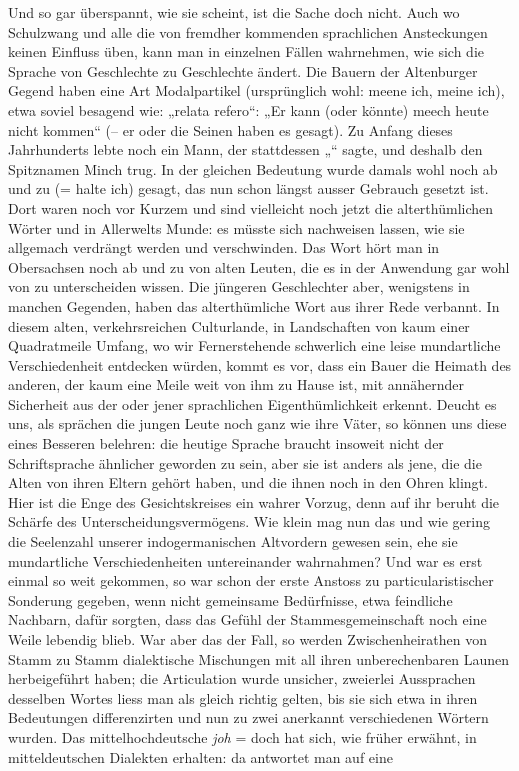 {Und so gar überspannt, wie sie scheint, ist die Sache doch nicht. Auch wo Schulzwang und alle die von fremdher kommenden sprachlichen Ansteckungen keinen Einfluss üben, kann man in einzelnen Fällen wahrnehmen, wie sich die Sprache von Geschlechte zu Geschlechte ändert. \label{fp.278} Die Bauern der Altenburger Gegend haben eine Art Modalpartikel  (ursprünglich wohl: meene ich, meine ich), etwa soviel besagend wie: „relata refero“: „Er kann (oder könnte) meech heute nicht kommen“ (– er oder die Seinen haben es gesagt). Zu Anfang dieses Jahrhunderts lebte noch ein Mann, der stattdessen „“ sagte, und deshalb den Spitznamen Minch trug. In der gleichen Bedeutung wurde damals wohl noch ab und zu  (= halte ich) gesagt, das nun schon längst ausser Gebrauch gesetzt ist. Dort waren noch vor Kurzem und sind vielleicht noch jetzt die alterthümlichen Wörter  und  in Allerwelts Munde: es müsste sich nachweisen lassen, wie sie allgemach verdrängt werden und verschwinden. Das Wort  hört man in Obersachsen noch ab und zu von alten Leuten, die es in der Anwendung gar wohl von  zu unterscheiden wissen. Die jüngeren Geschlechter aber, wenigstens in manchen Gegenden, haben das  alterthümliche Wort aus ihrer Rede verbannt. In diesem alten, verkehrsreichen Culturlande, in Landschaften von kaum einer Quadratmeile Umfang, wo wir Fernerstehende schwerlich eine leise mundartliche Verschiedenheit entdecken würden, kommt es vor, dass ein Bauer die Heimath des anderen, der kaum eine Meile weit von ihm zu Hause ist, mit annähernder Sicherheit aus der oder jener sprachlichen Eigenthümlichkeit erkennt. Deucht es uns, als sprächen die jungen Leute noch ganz wie ihre Väter, so können uns diese eines Besseren belehren: die heutige Sprache braucht insoweit nicht der Schriftsprache ähnlicher geworden zu sein, aber sie ist anders als jene, die die Alten von ihren Eltern gehört haben, und die ihnen noch in den Ohren klingt. Hier ist die Enge des Gesichtskreises ein wahrer Vorzug, denn auf ihr beruht die Schärfe des Unterscheidungsvermögens. Wie klein mag nun das  und wie gering die Seelenzahl unserer indo\-\label{sp.285}germanischen Altvordern gewesen sein, ehe sie mundartliche Verschiedenheiten untereinander wahrnahmen? Und war es erst einmal so weit gekommen, so war schon der erste Anstoss zu particularistischer Sonderung gegeben, wenn nicht gemeinsame Bedürfnisse, etwa feindliche Nachbarn, dafür sorgten, dass das Gefühl der Stammesgemeinschaft noch eine Weile lebendig blieb. War aber das der Fall, so werden Zwischenheirathen von Stamm zu Stamm dialektische Mischungen mit all ihren unberechenbaren Launen herbeigeführt haben; die Articulation wurde unsicher, zweierlei Aussprachen desselben Wortes liess man als gleich richtig gelten, bis sie sich etwa in ihren Bedeu\-\label{fp.279}tungen differenzirten und nun zu zwei anerkannt verschiedenen Wörtern wurden. Das mittelhochdeutsche \textit{joh} = doch hat sich, wie früher erwähnt, in mitteldeutschen Dialekten erhalten: da antwortet man auf eine }
